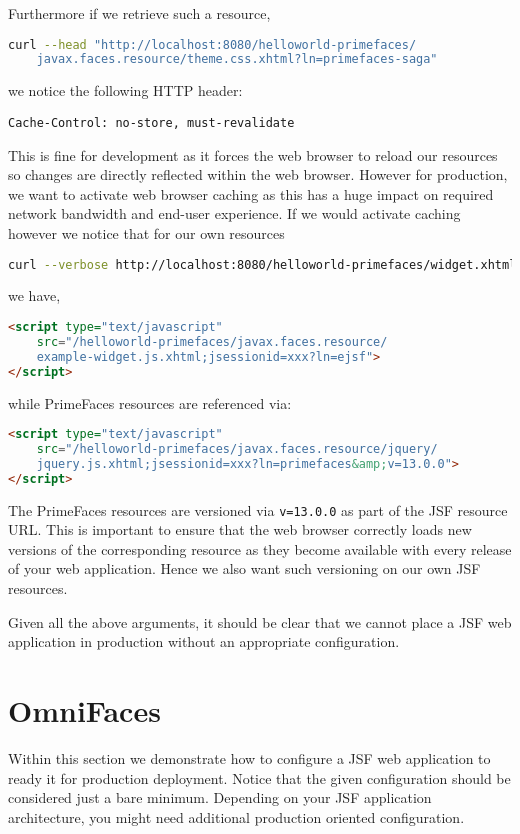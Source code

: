 Furthermore if we retrieve such a resource,
\begin{lstlisting}[language=bash]
curl --head "http://localhost:8080/helloworld-primefaces/
	javax.faces.resource/theme.css.xhtml?ln=primefaces-saga"
\end{lstlisting}
we notice the following HTTP header:
\begin{lstlisting}
Cache-Control: no-store, must-revalidate
\end{lstlisting}
This is fine for development as it forces the web browser to reload our resources so changes are directly reflected within the web browser.
However for production, we want to activate web browser caching as this has a huge impact on required network bandwidth and end-user experience.
If we would activate caching however we notice that for our own resources
\begin{lstlisting}[language=bash]
curl --verbose http://localhost:8080/helloworld-primefaces/widget.xhtml
\end{lstlisting}
we have,
\begin{lstlisting}[language=html]
<script type="text/javascript"
	src="/helloworld-primefaces/javax.faces.resource/
	example-widget.js.xhtml;jsessionid=xxx?ln=ejsf">
</script>
\end{lstlisting}
while PrimeFaces resources are referenced via:
\begin{lstlisting}[language=html]
<script type="text/javascript"
	src="/helloworld-primefaces/javax.faces.resource/jquery/
	jquery.js.xhtml;jsessionid=xxx?ln=primefaces&amp;v=13.0.0">
</script>
\end{lstlisting}
The PrimeFaces resources are versioned via \texttt{v=13.0.0} as part of the JSF resource URL.
This is important to ensure that the web browser correctly loads new versions of the corresponding resource as they become available with every release of your web application.
Hence we also want such versioning on our own JSF resources.

Given all the above arguments, it should be clear that we cannot place a JSF web application in production without an appropriate configuration.

\section{OmniFaces}
Within this section we demonstrate how to configure a JSF web application to ready it for production deployment.
Notice that the given configuration should be considered just a bare minimum.
Depending on your JSF application architecture, you might need additional production oriented configuration.

